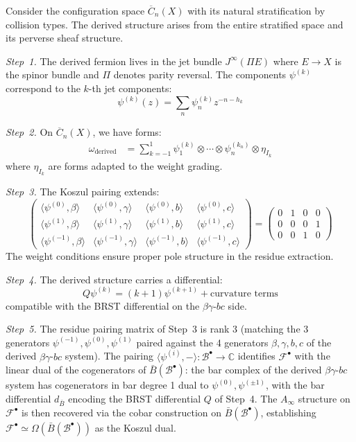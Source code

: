 \begin{evidence}
Consider the configuration space $\overline{C}_n(X)$ with its natural stratification by collision types.
The derived structure arises from the entire
stratified space and its perverse sheaf structure.

\emph{Step~1.} The derived fermion lives in the jet bundle 
$J^{\infty}(\Pi E)$ where $E \to X$ is the spinor bundle and $\Pi$ denotes parity reversal. 
The components $\psi^{(k)}$ correspond to the $k$-th jet components:
\[
\psi^{(k)}(z) = \sum_{n} \psi^{(k)}_n z^{-n-h_k}
\]

\emph{Step~2.} On $\overline{C}_n(X)$, we have forms:
\begin{align}
\omega_{\text{derived}} &= \sum_{k=-1}^{1} \psi^{(k)}_1 \otimes \cdots \otimes \psi^{(k_n)}_n \otimes \eta_{I_k}
\end{align}
where $\eta_{I_k}$ are forms adapted to the weight grading.

\emph{Step~3.} The Koszul pairing extends:
\[
\begin{pmatrix}
\langle \psi^{(0)}, \beta \rangle & \langle \psi^{(0)}, \gamma \rangle & \langle \psi^{(0)}, b \rangle & \langle \psi^{(0)}, c \rangle \\
\langle \psi^{(1)}, \beta \rangle & \langle \psi^{(1)}, \gamma \rangle & \langle \psi^{(1)}, b \rangle & \langle \psi^{(1)}, c \rangle \\
\langle \psi^{(-1)}, \beta \rangle & \langle \psi^{(-1)}, \gamma \rangle & \langle \psi^{(-1)}, b \rangle & \langle \psi^{(-1)}, c \rangle
\end{pmatrix}
=
\begin{pmatrix}
0 & 1 & 0 & 0 \\
0 & 0 & 0 & 1 \\
0 & 0 & 1 & 0
\end{pmatrix}
\]
The weight conditions ensure proper pole structure in the residue extraction.

\emph{Step~4.} The derived structure carries a differential:
\[
Q\psi^{(k)} = (k+1)\psi^{(k+1)} + \text{curvature terms}
\]
compatible with the BRST differential on the $\beta\gamma$-$bc$ side.

\emph{Step~5.}
The residue pairing matrix of Step~3 is rank 3 (matching the 3 generators $\psi^{(-1)}, \psi^{(0)}, \psi^{(1)}$ paired against the 4 generators $\beta, \gamma, b, c$ of the derived $\beta\gamma$-$bc$ system).  The pairing $\langle \psi^{(i)}, - \rangle: \mathcal{B}^{\bullet} \to \mathbb{C}$ identifies $\mathcal{F}^{\bullet}$ with the linear dual of the cogenerators of $\bar{B}(\mathcal{B}^{\bullet})$: the bar complex of the derived $\beta\gamma$-$bc$ system has cogenerators in bar degree 1 dual to $\psi^{(0)}, \psi^{(\pm 1)}$, with the bar differential $d_{\bar{B}}$ encoding the BRST differential $Q$ of Step~4.  The $A_\infty$ structure on $\mathcal{F}^{\bullet}$ is then recovered via the cobar construction on $\bar{B}(\mathcal{B}^{\bullet})$, establishing $\mathcal{F}^{\bullet} \simeq \Omega(\bar{B}(\mathcal{B}^{\bullet}))$ as the Koszul dual.
\end{evidence}

